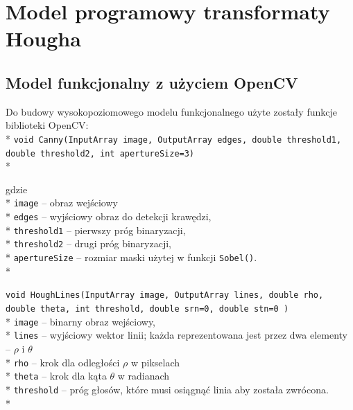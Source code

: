 \section{Model programowy transformaty Hougha}

\blindtext

\subsection{Model funkcjonalny z użyciem OpenCV}

Do budowy wysokopoziomowego modelu funkcjonalnego użyte zostały funkcje biblioteki OpenCV:\\*
\texttt{void Canny(InputArray image, OutputArray edges, double threshold1, double threshold2, int apertureSize=3)} \\*

gdzie \\*
\texttt{image} – obraz wejściowy \\*
\texttt{edges} – wyjściowy obraz do detekcji krawędzi, \\*
\texttt{threshold1} – pierwszy próg binaryzacji,\\*
\texttt{threshold2} – drugi próg binaryzacji,\\*
\texttt{apertureSize} – rozmiar maski użytej w funkcji \texttt{Sobel()}.\\*

\texttt{void HoughLines(InputArray image, OutputArray lines, double rho, double theta, int threshold, double srn=0, double stn=0 )} \\*
\texttt{image} – binarny obraz wejściowy, \\*
\texttt{lines} – wyjściowy wektor linii; każda reprezentowana jest przez dwa elementy – $\rho$ i $\theta$ \\*
\texttt{rho} – krok dla odległości $\rho$ w pikselach \\*
\texttt{theta} – krok dla kąta $\theta$ w radianach \\*
\texttt{threshold} – próg głosów, które musi osiągnąć linia aby została zwrócona. \\*

